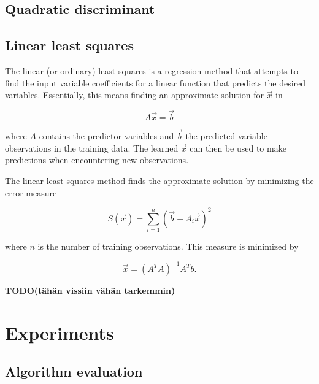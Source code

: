 \documentclass[twoside]{article}
\newcommand{\todo}[1]{\textbf{TODO(#1)}}
\renewcommand{\v}[1]{\vec{#1}}
\begin{document}
\begin{multicols}{2}
\subsection{Quadratic discriminant}

\subsection{Linear least squares}

The linear (or ordinary) least squares is a regression method that attempts to
find the input variable coefficients for a linear function that predicts the desired variables.
Essentially, this means finding an approximate solution for $\v{x}$ in

\begin{equation*}
 A\v{x} = \v{b}
\end{equation*}

where $A$ contains the predictor variables and $\v{b}$ the predicted variable observations
in the training data. The learned $\v{x}$ can then be used to make predictions when encountering
new observations.

The linear least squares method finds the approximate solution by minimizing the error measure

\begin{equation}
 S(\v{x}) = \sum_{i=1}^n (\v{b} - A_i \v{x})^2
\end{equation}

where $n$ is the number of training observations. This measure is minimized by

\begin{equation}
 \v{x} = (A^T A)^{-1} A^T b.
\end{equation}

\todo{tähän vissiin vähän tarkemmin}



\section{Experiments}

\subsection{Algorithm evaluation}


\end{multicols}
\end{document}
